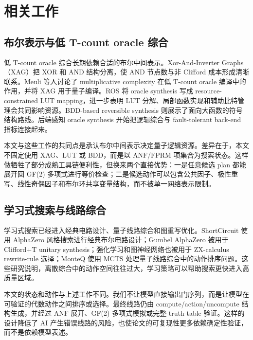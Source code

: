 \documentclass[UTF8,fontset=macnew,11pt]{ctexart}
\newcommand{\anf}{\ensuremath{\mathrm{ANF}}}
\newcommand{\fprm}{\ensuremath{\mathrm{FPRM}}}
\newcommand{\mcts}{\ensuremath{\mathrm{MCTS}}}
\newcommand{\ttable}{truth-table}
\begin{document}
\section{相关工作}

\subsection{布尔表示与低 T-count oracle 综合}

低 T-count oracle 综合长期依赖合适的布尔中间表示。Xor-And-Inverter Graphs（XAG）把 XOR 和 AND 结构分离，使 AND 节点数与非 Clifford 成本形成清晰联系。Meuli 等人讨论了 multiplicative complexity 在低 T-count oracle 编译中的作用\cite{meuli2019multiplicative}，并将 XAG 用于量子编译\cite{meuli2022xag}。ROS 将 oracle synthesis 写成 resource-constrained LUT mapping\cite{meuli2020ros}，进一步表明 LUT 分解、局部函数实现和辅助比特管理会共同影响资源。BDD-based reversible synthesis 则展示了面向大函数的符号结构路线\cite{wille2009bdd}。后端感知 oracle synthesis 开始把逻辑综合与 fault-tolerant back-end 指标连接起来\cite{yu2025backend}。

本文与这些工作的共同点是承认布尔中间表示决定量子逻辑资源。差异在于，本文不固定使用 XAG、LUT 或 BDD，而是以 \anf{}/\fprm{} 项集合为搜索状态。这样做牺牲了部分成熟工具链便利性，但换来两个直接优势：一是任意候选 plan 都能展开回 GF(2) 多项式进行等价检查；二是候选动作可以包含公共因子、极性重写、线性奇偶因子和布尔环共享变量结构，而不被单一网络表示限制。

\subsection{学习式搜索与线路综合}

学习式搜索已经进入经典电路设计、量子线路综合和图重写优化。ShortCircuit 使用 AlphaZero 风格搜索进行经典布尔电路设计\cite{tsaras2024shortcircuit}；Gumbel AlphaZero 被用于 Clifford+T unitary synthesis\cite{rietsch2024unitary}；强化学习和图神经网络也被用于 ZX-calculus rewrite-rule 选择\cite{riu2025rlzx}；MonteQ 使用 \mcts{} 处理量子线路综合中的动作排序问题\cite{machiya2026monteq}。这些研究说明，离散综合中的动作空间往往过大，学习策略可以帮助搜索更快进入高质量区域。

本文的状态和动作与上述工作不同。我们不让模型直接输出门序列，而是让模型在可验证的代数动作之间排序或选择。最终线路仍由 compute/action/uncompute 结构生成，并经过 \anf{} 展开、GF(2) 多项式模拟或完整 \ttable{} 验证。这样的设计降低了 AI 产生错误线路的风险，也使论文的可复现性更多依赖确定性验证，而不是依赖模型表述。
\end{document}
